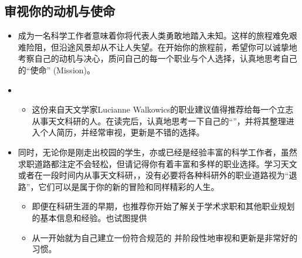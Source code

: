 \documentclass[letterpaper,10pt,english]{sphinxmanual}
\begin{document}
\subsection{审视你的动机与使命}
\label{\detokenize{resource/research/getting_started_cn:id2}}\begin{itemize}
\item {} 
成为一名科学工作者意味着你将代表人类勇敢地踏入未知。这样的旅程难免艰难险阻，但沿途风景却从不让人失望。在开始你的旅程前，希望你可以诚挚地考察自己的动机与决心，质问自己的每一个职业与个人选择，认真地思考自己的“使命”
(Mission)。

\item {} 
\begin{itemize}
\item {} 
这份来自天文学家Lucianne
Walkowics的职业建议值得推荐给每一个立志从事天文科研的人。在读完后，认真地思考一下自己的“”，并将其整理进入个人简历，并经常审视，更新是不错的选择。

\end{itemize}

\item {} 
同时，无论你是刚走出校园的学生，亦或已经是经验丰富的科学工作者，虽然求职道路都注定不会轻松，但请记得你有着丰富和多样的职业选择。学习天文或者在一段时间内从事天文科研，，没有必要将各种科研外的职业道路视为“退路”，它们可以是属于你的新的冒险和同样精彩的人生。
\begin{itemize}
\item {} 
即便在科研生涯的早期，也推荐你开始了解关于学术求职和其他职业规划的基本信息和经验。也试图提供

\item {} 
从一开始就为自己建立一份符合规范的
并阶段性地审视和更新是非常好的习惯。

\end{itemize}

\end{itemize}
\end{document}
